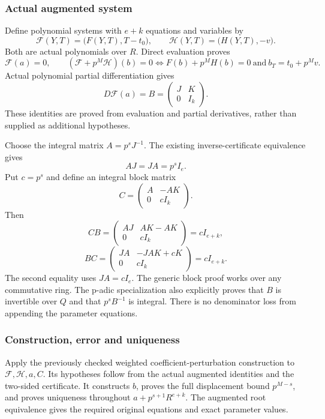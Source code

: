 \hypertarget{cont10:actual-augmented-system}{%
\subsubsection{Actual augmented system}\label{cont10:actual-augmented-system}}

Define polynomial systems with \(e+k\) equations and variables by \[
\mathcal F(Y,T)=\bigl(F(Y,T),T-t_0\bigr),\qquad
\mathcal H(Y,T)=\bigl(H(Y,T),-v\bigr).
\] Both are actual polynomials over \(R\). Direct evaluation proves \[
\mathcal F(a)=0,
\qquad
(\mathcal F+p^M\mathcal H)(b)=0
\iff F(b)+p^MH(b)=0\ \text{and}\ b_T=t_0+p^Mv.
\] Actual polynomial partial differentiation gives \[
D\mathcal F(a)=B=\begin{pmatrix}J&K\\0&I_k\end{pmatrix}.
\] These identities are proved from evaluation and partial derivatives,
rather than supplied as additional hypotheses.

Choose the integral matrix \(A=p^sJ^{-1}\). The existing
inverse-certificate equivalence gives \[
AJ=JA=p^sI_e.
\] Put \(c=p^s\) and define an integral block matrix \[
C=\begin{pmatrix}A&-AK\\0&cI_k\end{pmatrix}.
\] Then \[
CB=\begin{pmatrix}AJ&AK-AK\\0&cI_k\end{pmatrix}=cI_{e+k},
\] \[
BC=\begin{pmatrix}JA&-JAK+cK\\0&cI_k\end{pmatrix}=cI_{e+k}.
\] The second equality uses \(JA=cI_e\). The generic block proof works
over any commutative ring. The p-adic specialization also explicitly
proves that \(B\) is invertible over \(Q\) and that \(p^sB^{-1}\) is
integral. There is no denominator loss from appending the parameter
equations.

\hypertarget{cont10:construction-error-and-uniqueness}{%
\subsubsection{Construction, error and
uniqueness}\label{cont10:construction-error-and-uniqueness}}

Apply the previously checked weighted coefficient-perturbation
construction to \(\mathcal F,\mathcal H,a,C\). Its hypotheses follow
from the actual augmented identities and the two-sided certificate. It
constructs \(b\), proves the full displacement bound \(p^{M-s}\), and
proves uniqueness throughout \(a+p^{s+1}R^{e+k}\). The augmented root
equivalence gives the required original equations and exact parameter
values.

